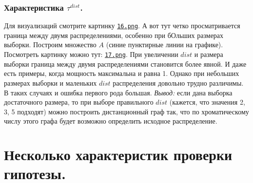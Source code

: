 \documentclass{report}
\begin{document}
\section{Характеристика $\tau^{dist}$.}
Для визуализаций смотрите картинку \texttt{\href{https://github.com/misshimichka/dm-random-graphs/blob/report/report/16.png}{16.png}}.
\newline
\newline
А вот тут четко просматривается граница между двумя распределениями, особенно при бОльших размерах выборки. Построим множество $A$ (синие пунктирные линии на графике).
\newline
\newline
Посмотреть картинку можно тут: \texttt{\href{https://github.com/misshimichka/dm-random-graphs/blob/report/report/17.png}{17.png}}.
\newline
\newline
При увеличении $dist$ и размера выборки граница между двумя распределениями становится более явной. И даже есть примеры, когда мощность максимальна и равна 1.
Однако при небольших размерах выборки и маленьких $dist$ распределения довольно трудно различимы. В таких случаях и ошибка первого рода большая.
\newline
\newline
\emph{Вывод:} если дана выборка достаточного размера, то при выборе правильного $dist$ (кажется, что значения 2, 3, 5 подходят) можно построить дистанционный граф так, что по хроматическому числу этого графа будет возможно определить исходное распределение.

\part{Несколько характеристик проверки гипотезы.}
\end{document}
